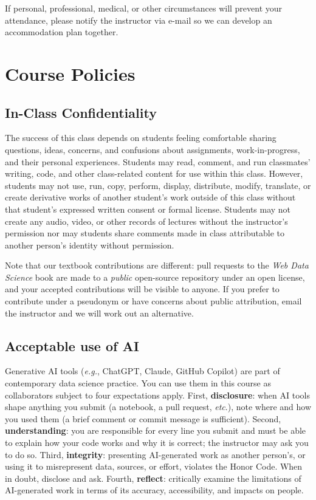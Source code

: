 \documentclass[11pt]{memoir}
\begin{document}
If personal, professional, medical, or other circumstances will prevent your attendance, please notify the instructor via e-mail so we can develop an accommodation plan together.

\section{Course Policies}

\subsection{In-Class Confidentiality}
The success of this class depends on students feeling comfortable sharing questions, ideas, concerns, and confusions about assignments, work-in-progress, and their personal experiences. Students may read, comment, and run classmates' writing, code, and other class-related content for use within this class. However, students may not use, run, copy, perform, display, distribute, modify, translate, or create derivative works of another student's work outside of this class without that student's expressed written consent or formal license. Students may not create any audio, video, or other records of lectures without the instructor's permission nor may students share comments made in class attributable to another person's identity without permission.

Note that our textbook contributions are different: pull requests to the \textit{Web Data Science} book are made to a \textit{public} open-source repository under an open license, and your accepted contributions will be visible to anyone. If you prefer to contribute under a pseudonym or have concerns about public attribution, email the instructor and we will work out an alternative.

\subsection{Acceptable use of AI}
Generative AI tools (\textit{e.g.}, ChatGPT, Claude, GitHub Copilot) are part of contemporary data science practice. You can use them in this course as collaborators subject to four expectations apply. First, \textbf{disclosure}: when AI tools shape anything you submit (a notebook, a pull request, \textit{etc}.), note where and how you used them (a brief comment or commit message is sufficient). Second, \textbf{understanding}: you are responsible for every line you submit and must be able to explain how your code works and why it is correct; the instructor may ask you to do so. Third, \textbf{integrity}: presenting AI-generated work as another person's, or using it to misrepresent data, sources, or effort, violates the Honor Code. When in doubt, disclose and ask. Fourth, \textbf{reflect}: critically examine the limitations of AI-generated work in terms of its accuracy, accessibility, and impacts on people.
\end{document}

